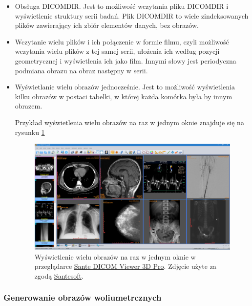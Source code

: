 \begin{itemize}

    \item Obsługa DICOMDIR.
          Jest to możliwość wczytania pliku DICOMDIR i wyświetlenie struktury serii badań.
          Plik DICOMDIR to wiele zindeksowanych plików zawierający ich zbiór elementów danych, bez obrazów.

    \item Wczytanie wielu plików i ich połączenie w formie filmu, czyli możliwość wczytania wielu plików z tej samej serii, ułożenia ich według pozycji geometrycznej i wyświetlenia ich jako film.
          Innymi słowy jest periodyczna podmiana obrazu na obraz następny w serii.

    \item Wyświetlanie wielu obrazów jednocześnie.
          Jest to możliwość wyświetlenia kilku obrazów w postaci tabelki, w której każda komórka była by innym obrazem.

          Przykład wyświetlenia wielu obrazów na raz w jednym oknie znajduje się na rysunku \ref{fig:dicomviewer001}

          \begin{figure}[!htbp]
              \centering
              \includegraphics[width=\textwidth]{img/dicom-viewer-001.png}
              \caption{Wyświetlenie wielu obrazów na raz w jednym oknie w przeglądarce \href{https://www.santesoft.com/win/sante-dicom-viewer-3d-pro/sante-dicom-viewer-3d-pro.html}{Sante DICOM Viewer 3D Pro}. Zdjęcie użyte za zgodą \href{https://www.santesoft.com/}{Santesoft}.}
              \label{fig:dicomviewer001}
          \end{figure}
\end{itemize}

\subsubsection{Generowanie obrazów woliumetrcznych}

